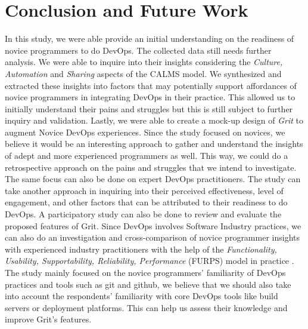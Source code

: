 \documentclass{sigchi}
\begin{document}
\section{Conclusion and Future Work}
In this study, we were able provide an initial understanding on the readiness of novice programmers to do DevOps. The collected data still needs further analysis. We were able to inquire into their insights considering the \textit{Culture, Automation} and \textit{Sharing} aspects of the CALMS model. We synthesized and extracted these insights into factors that may potentially support affordances of novice programmers in integrating DevOps in their practice. This allowed us to initially understand their pains and struggles but this is still subject to further inquiry and validation. Lastly, we were able to create a mock-up design of \textit{Grit} to augment Novice DevOps experiences. Since the study focused on novices, we believe it would be an interesting approach to gather and understand the insights of adept and more experienced programmers as well. This way, we could do a retrospective approach on the pains and struggles that we intend to investigate. The same focus can also be done on expert DevOps practitioners. The study can take another approach in inquiring into their perceived effectiveness, level of engagement, and other factors that can be attributed to their readiness to do DevOps. A participatory study can also be done to review and evaluate the proposed features of Grit. Since DevOps involves Software Industry practices, we can also do an investigation and cross-comparison of novice programmer insights with experienced industry practitioners with the help of the \textit{Functionality, Usability, Supportability, Reliability, Performance} (FURPS) model in practice \cite{al2010quality}.
The study mainly focused on the novice programmers' familiarity of DevOps practices and tools such as git and github, we believe that we should also take into account the respondents' familiarity with core DevOps tools like build servers or deployment platforms. This can help us assess their knowledge and improve Grit's features. 
\balance{}


\end{document}
